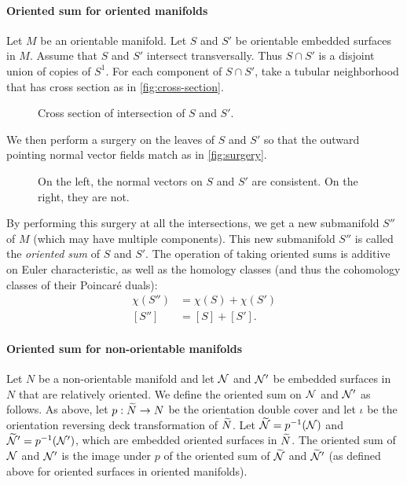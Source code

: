\paragraph{Oriented sum for oriented manifolds}
Let $M$ be an orientable manifold.
Let $S$ and $S'$ be orientable embedded surfaces in $M$.
Assume that $S$ and $S'$ intersect transversally.
Thus $S \cap S'$ is a disjoint union of copies of $S^1$.
For each component of $S\cap S'$, take a tubular neighborhood that has cross section as in \autoref{fig:cross-section}.
\begin{figure}
  \centering
  \caption{Cross section of intersection of $S$ and $S'$.}
  \label{fig:cross-section}
\end{figure}



We then perform a surgery on the leaves of $S$ and $S'$ so that the outward pointing normal vector fields match as in \autoref{fig:surgery}.
\begin{figure}[b]
  \centering
  \caption{On the left, the normal vectors on $S$ and $S'$ are consistent. On the right, they are not.}
  \label{fig:surgery}
\end{figure}

By performing this surgery at all the intersections, we get a new submanifold $S''$ of $M$ (which may have multiple components).
This new submanifold $S''$ is called the {\it oriented sum} of $S$ and $S'$.
The operation of taking oriented sums is additive on Euler characteristic, as well as the homology classes (and thus the cohomology classes of their Poincar\'e duals):
\begin{align*}
  \chi(S'') &= \chi(S) + \chi(S') \\
  [S''] &= [S] + [S'].
\end{align*}

\paragraph{Oriented sum for non-orientable manifolds}

Let $N$ be a non-orientable manifold and let $\mathcal{N}$ and $\mathcal{N}'$ be embedded surfaces in $N$ that are relatively oriented.
We define the oriented sum on $\mathcal{N}$ and $\mathcal{N}'$ as follows.
As above, let $p:\widetilde{N}\rightarrow N$ be the orientation double cover and let $\iota$ be the orientation reversing deck transformation of $\widetilde{N}$.
Let $\widetilde{\mathcal{N}}=p^{-1}(\mathcal{N})$ and $\widetilde{\mathcal{N}}'=p^{-1}(\mathcal{N}')$, which are embedded oriented surfaces in $\widetilde{N}$.
The oriented sum of $\mathcal{N}$ and $\mathcal{N}'$ is the image under $p$ of the oriented sum of $\widetilde{\mathcal{N}}$ and $\widetilde{\mathcal{N}}'$ (as defined above for oriented surfaces in oriented manifolds).

